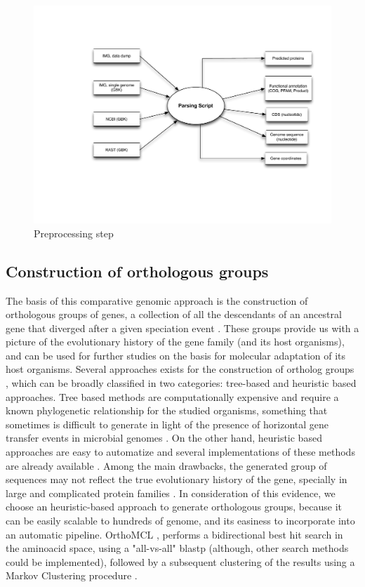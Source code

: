 \begin{figure}[htbp]
	\centering
	\includegraphics[width=\textwidth]{Chapter6/Figures/PreprocessingOverview.pdf}
	\caption{Preprocessing step}
	\label{Preprocessing}
\end{figure}

\subsection{Construction of orthologous groups}

The basis of this comparative genomic approach is the construction of orthologous groups of genes, a collection of all the descendants of an ancestral gene that diverged after a given speciation event  \cite{Kristensen:2011gw}. These groups provide us with a picture of the evolutionary history of the gene family (and its host organisms), and can be used for further studies on the basis for molecular adaptation of its host organisms.
Several approaches exists for the construction of ortholog groups \cite{Kristensen:2011gw}, which can be broadly classified in two categories: tree-based and heuristic based approaches. Tree based methods are computationally expensive and require a known phylogenetic relationship for the studied organisms, something that sometimes is difficult to generate in light of the presence of horizontal gene transfer events in microbial genomes \cite{Koonin:2001vz}. On the other hand, heuristic based approaches are easy to automatize and several implementations of these methods are already available \cite{Kristensen:2011gw}. Among the main drawbacks, the generated group of sequences may not reflect the true evolutionary history of the gene, specially in large and complicated protein families \cite{Chen:2007kk}.
In consideration of this evidence, we choose an heuristic-based approach to generate orthologous groups, because it can be easily scalable to hundreds of genome, and its easiness to incorporate into an automatic pipeline. OrthoMCL \cite{Li:2003en}, performs a bidirectional best hit search in the aminoacid space, using a "all-vs-all" blastp (although, other search methods could be implemented), followed by a subsequent clustering of the results using a Markov Clustering procedure \cite{Enright:2002uq}.

